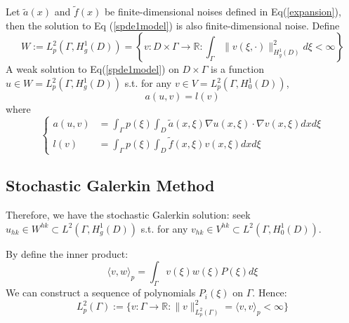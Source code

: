 \begin{definition}
    Let $\tilde{a}(x)$ and $\tilde{f}(x)$ be finite-dimensional noises defined in Eq(\ref{expansion}), then the solution to Eq (\ref{spde1model}) is also finite-dimensional noise. 
    Define
    \begin{equation}
        W:=L^2_p(\Gamma, H^1_g(D)) = \left\{v:D\times \Gamma\to \mathbb{R}: \int_\Gamma \|v(\xi, \cdot)\|_{H^1_g(D)}^2d\xi<\infty\right\}
    \end{equation}
    A weak solution to Eq(\ref{spde1model}) on $D\times \Gamma$ is a function $u\in W=L^2_p(\Gamma, H^1_g(D))$ s.t. for any $v\in V=L^2_p(\Gamma, H^1_0(D))$,
    \begin{equation}
        a(u, v) = l(v)\label{weakfd}
    \end{equation}
    where
    \begin{equation}\left\{
        \begin{aligned}
            a(u, v) &= \int_\Gamma p(\xi)\int_D \tilde{a}(x, \xi)\nabla u(x, \xi)\cdot \nabla v(x, \xi)dxd\xi\\
            l(v) &= \int_\Gamma p(\xi)\int_D \tilde{f}(x, \xi)v(x, \xi)dxd\xi
        \end{aligned}\right.
    \end{equation}
\end{definition}
\subsection{Stochastic Galerkin Method}
Therefore, we have the stochastic Galerkin solution: seek $u_{hk}\in W^{hk}\subset L^2(\Gamma, H^1_g(D))$ s.t. for any $v_{hk}\in V^{hk}\subset L^2(\Gamma, H^1_0(D))$.

By define the inner product:
\begin{equation}
    \langle v, w\rangle_{p} = \int_\Gamma v(\xi)w(\xi)P(\xi)d\xi
\end{equation}
We can construct a sequence of polynomials $P_i(\xi)$ on $\Gamma$. Hence:
\begin{equation}
    L^2_p(\Gamma):=\{v:\Gamma\to \mathbb{R}: \|v\|^2_{L^2_p(\Gamma)} = \langle v, v\rangle_p<\infty\}
\end{equation}

